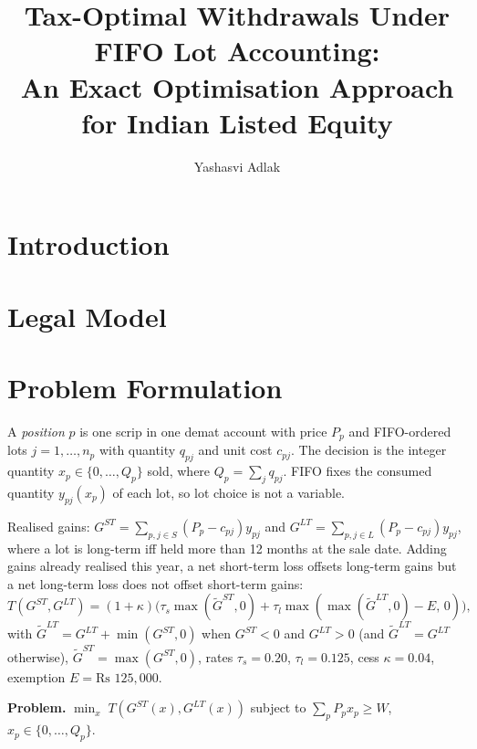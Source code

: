 \documentclass[11pt]{article}
\title{Tax-Optimal Withdrawals Under FIFO Lot Accounting:\\ An Exact Optimisation Approach for Indian Listed Equity}
\author{Yashasvi Adlak}
\date{}
\begin{document}
\maketitle

\begin{abstract}
\end{abstract}

\section{Introduction}

\section{Legal Model}

\section{Problem Formulation}
A \emph{position} $p$ is one scrip in one demat account with price $P_p$ and FIFO-ordered lots $j=1,\dots,n_p$
with quantity $q_{pj}$ and unit cost $c_{pj}$. The decision is the integer quantity $x_p \in \{0,\dots,Q_p\}$ sold,
where $Q_p=\sum_j q_{pj}$. FIFO fixes the consumed quantity $y_{pj}(x_p)$ of each lot, so lot choice is not a variable.

Realised gains: $G^{ST}=\sum_{p,j\in S}(P_p-c_{pj})y_{pj}$ and $G^{LT}=\sum_{p,j\in L}(P_p-c_{pj})y_{pj}$,
where a lot is long-term iff held more than 12 months at the sale date. Adding gains already realised this year,
a net short-term loss offsets long-term gains but a net long-term loss does not offset short-term gains:
\[
T(G^{ST},G^{LT}) = (1+\kappa)\Big(\tau_s \max(\tilde G^{ST},0) + \tau_l \max(\max(\tilde G^{LT},0)-E,\,0)\Big),
\]
with $\tilde G^{LT}=G^{LT}+\min(G^{ST},0)$ when $G^{ST}<0$ and $G^{LT}>0$ (and $\tilde G^{LT}=G^{LT}$ otherwise),
$\tilde G^{ST}=\max(G^{ST},0)$, rates $\tau_s=0.20$, $\tau_l=0.125$, cess $\kappa=0.04$, exemption $E=\text{Rs }125{,}000$.

\textbf{Problem.} $\min_x\; T(G^{ST}(x),G^{LT}(x))$ subject to $\sum_p P_p x_p \ge W$, $x_p\in\{0,\dots,Q_p\}$.
\end{document}
